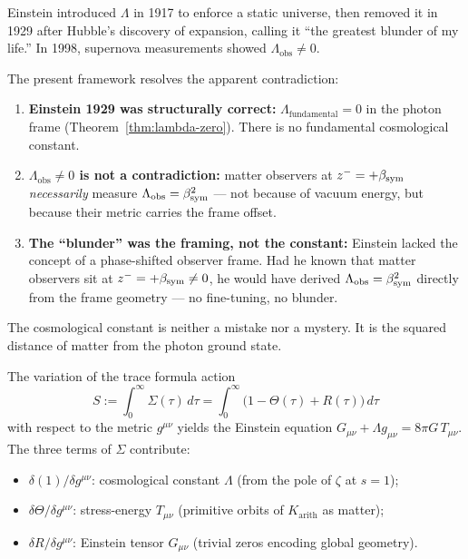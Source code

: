 \begin{remark}
\label{rem:einstein-blunder}
Einstein introduced $\Lambda$ in 1917 to enforce a static universe,
then removed it in 1929 after Hubble's discovery of expansion, calling
it ``the greatest blunder of my life.'' In 1998, supernova measurements
showed $\Lambda_{\mathrm{obs}} \neq 0$.

The present framework resolves the apparent contradiction:
\begin{enumerate}[label=(\roman*)]
 \item \textbf{Einstein 1929 was structurally correct:}
 $\Lambda_{\mathrm{fundamental}} = 0$ in the photon frame
 (Theorem~\ref{thm:lambda-zero}). There is no fundamental
 cosmological constant.
 \item \textbf{$\Lambda_{\mathrm{obs}} \neq 0$ is not a contradiction:}
 matter observers at $z^- = +\beta_{\mathrm{sym}}$ \emph{necessarily} measure
 $\Lambda_{\mathrm{obs}} = \beta_{\mathrm{sym}}^2$ --- not because of vacuum energy,
 but because their metric carries the frame offset.
 \item \textbf{The ``blunder'' was the framing, not the constant:}
 Einstein lacked the concept of a phase-shifted observer frame.
 Had he known that matter observers sit at $z^- = +\beta_{\mathrm{sym}} \neq 0$,
 he would have derived $\Lambda_{\mathrm{obs}} = \beta_{\mathrm{sym}}^2$ directly
 from the frame geometry --- no fine-tuning, no blunder.
\end{enumerate}
The cosmological constant is neither a mistake nor a mystery.
It is the squared distance of matter from the photon ground state.
\end{remark}



\begin{theorem}\label{thm:einstein}
The variation of the trace formula action
\[
 S := \int_0^\infty\Sigma(\tau)\,d\tau
 = \int_0^\infty\bigl(1-\Theta(\tau)+R(\tau)\bigr)\,d\tau
\]
with respect to the metric $g^{\mu\nu}$ yields the Einstein equation
$G_{\mu\nu}+\Lambda g_{\mu\nu} = 8\pi G\,T_{\mu\nu}$.
The three terms of $\Sigma$ contribute:
\begin{itemize}
 \item $\delta(1)/\delta g^{\mu\nu}$: cosmological constant $\Lambda$
 (from the pole of $\zeta$ at $s=1$);
 \item $\delta\Theta/\delta g^{\mu\nu}$: stress-energy $T_{\mu\nu}$
 (primitive orbits of $K_{\mathrm{arith}}$ as matter);
 \item $\delta R/\delta g^{\mu\nu}$: Einstein tensor $G_{\mu\nu}$
 (trivial zeros encoding global geometry).
\end{itemize}
\end{theorem}


